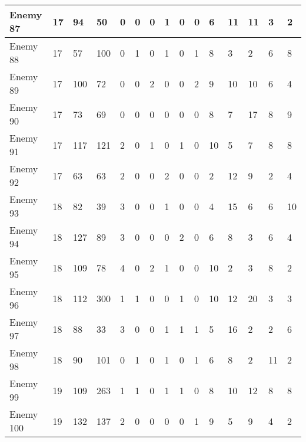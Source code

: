 \begin{sidewaystable}[!h]
{\begin{tabular}{|l|l|l|l|l|l|l|l|l|l|l|l|l|l|l|}
			Enemy 87 & 17 & 94 & 50 & 0 & 0 & 0 & 1 & 0 & 0 & 6 & 11 & 11 & 3 & 2 \\ \hline
			Enemy 88 & 17 & 57 & 100 & 0 & 1 & 0 & 1 & 0 & 1 & 8 & 3 & 2 & 6 & 8 \\ \hline
			Enemy 89 & 17 & 100 & 72 & 0 & 0 & 2 & 0 & 0 & 2 & 9 & 10 & 10 & 6 & 4 \\ \hline
			Enemy 90 & 17 & 73 & 69 & 0 & 0 & 0 & 0 & 0 & 0 & 8 & 7 & 17 & 8 & 9 \\ \hline
			Enemy 91 & 17 & 117 & 121 & 2 & 0 & 1 & 0 & 1 & 0 & 10 & 5 & 7 & 8 & 8 \\ \hline
			Enemy 92 & 17 & 63 & 63 & 2 & 0 & 0 & 2 & 0 & 0 & 2 & 12 & 9 & 2 & 4 \\ \hline
			Enemy 93 & 18 & 82 & 39 & 3 & 0 & 0 & 1 & 0 & 0 & 4 & 15 & 6 & 6 & 10 \\ \hline
			Enemy 94 & 18 & 127 & 89 & 3 & 0 & 0 & 0 & 2 & 0 & 6 & 8 & 3 & 6 & 4 \\ \hline
			Enemy 95 & 18 & 109 & 78 & 4 & 0 & 2 & 1 & 0 & 0 & 10 & 2 & 3 & 8 & 2 \\ \hline
			Enemy 96 & 18 & 112 & 300 & 1 & 1 & 0 & 0 & 1 & 0 & 10 & 12 & 20 & 3 & 3 \\ \hline
			Enemy 97 & 18 & 88 & 33 & 3 & 0 & 0 & 1 & 1 & 1 & 5 & 16 & 2 & 2 & 6 \\ \hline
			Enemy 98 & 18 & 90 & 101 & 0 & 1 & 0 & 1 & 0 & 1 & 6 & 8 & 2 & 11 & 2 \\ \hline
			Enemy 99 & 19 & 109 & 263 & 1 & 1 & 0 & 1 & 1 & 0 & 8 & 10 & 12 & 8 & 8 \\ \hline
			Enemy 100 & 19 & 132 & 137 & 2 & 0 & 0 & 0 & 0 & 1 & 9 & 5 & 9 & 4 & 2 \\ \hline
		\end{tabular}%
	}
\end{sidewaystable}
\clearpage


